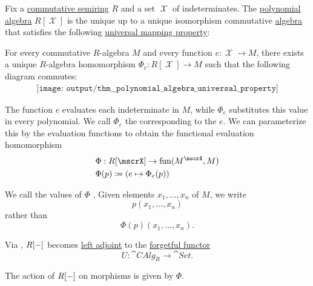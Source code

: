 \begin{theorem}\label{thm:polynomial_algebra_universal_property}
  Fix a \hyperref[def:semiring/commutative]{commutative semiring} \( R \) and a set \( \mscrX \) of indeterminates. The \hyperref[def:polynomial_algebra]{polynomial algebra} \( R[\mscrX] \) is the unique up to a unique isomorphism commutative \hyperref[def:algebra_over_semiring]{algebra} that satisfies the following \hyperref[rem:universal_mapping_property]{universal mapping property}:
  \begin{displayquote}
    For every commutative \( R \)-algebra \( M \) and every function \( e: \mscrX \to M \), there exists a unique \( R \)-algebra homomorphism \( \Phi_e: R[\mscrX] \to M \) such that the following diagram commutes:
    \begin{equation}\label{eq:thm:polynomial_algebra_universal_property/diagram}
      \begin{aligned}
        \texttt{[image: output/thm\_\_polynomial\_algebra\_universal\_property]}
      \end{aligned}
    \end{equation}
  \end{displayquote}

  The function \( e \) evaluates each indeterminate in \( M \), while \( \Phi_e \) substitutes this value in every polynomial. We call \( \Phi_e \) the  corresponding to the  \( e \). We can parameterize this by the evaluation functions to obtain the functional evaluation homomorphism
  \begin{equation*}
    \begin{aligned}
      &\Phi: R[\mscrX] \to \fun(M^\mscrX, M) \\
      &\Phi(p) \coloneqq (e \mapsto \Phi_e(p))
    \end{aligned}
  \end{equation*}

  We call the values of \( \Phi \) . Given elements \( x_1, \ldots, x_n \) of \( M \), we write
  \begin{equation*}
    p(x_1, \ldots, x_n)
  \end{equation*}
  rather than
  \begin{equation*}
    \Phi(p)(x_1, \ldots, x_n).
  \end{equation*}

  Via , \( R[\anon*] \) becomes \hyperref[def:category_adjunction]{left adjoint} to the \hyperref[def:concrete_category]{forgetful functor}
  \begin{equation*}
    U: \cat{CAlg}_R \to \cat{Set}.
  \end{equation*}

  The action of \( R[\anon*] \) on morphisms is given by \( \Phi \).
\end{theorem}
